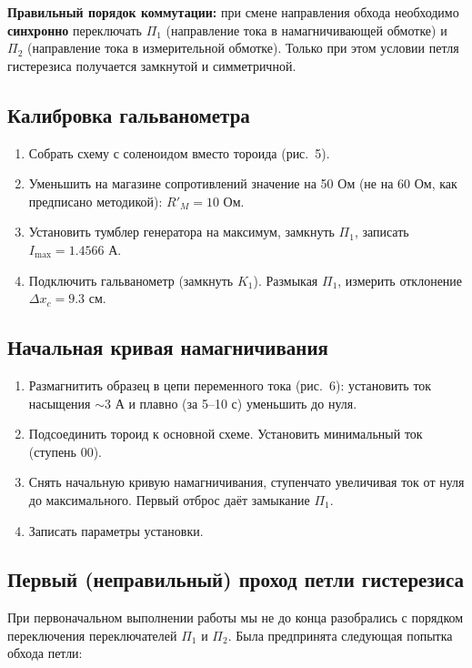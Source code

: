 \documentclass[a4paper]{article}
\begin{document}
\textbf{Правильный порядок коммутации:} при смене направления обхода необходимо \textbf{синхронно} переключать $\Pi_1$ (направление тока в намагничивающей обмотке) и $\Pi_2$ (направление тока в измерительной обмотке). Только при этом условии петля гистерезиса получается замкнутой и симметричной.

\subsection{Калибровка гальванометра}

\begin{enumerate}
	\item Собрать схему с соленоидом вместо тороида (рис.~5).
	\item Уменьшить на магазине сопротивлений значение на 50 Ом (не на 60 Ом, как предписано методикой): $R'_M = 10$ Ом.
	\item Установить тумблер генератора на максимум, замкнуть $\Pi_1$, записать $I_{\max} = 1.4566$ А.
	\item Подключить гальванометр (замкнуть $K_1$). Размыкая $\Pi_1$, измерить отклонение $\Delta x_c = 9.3$ см.
\end{enumerate}

\subsection{Начальная кривая намагничивания}

\begin{enumerate}
	\item Размагнитить образец в цепи переменного тока (рис.~6): установить ток насыщения $\sim 3$ А и плавно (за 5–10 с) уменьшить до нуля.
	\item Подсоединить тороид к основной схеме. Установить минимальный ток (ступень 00).
	\item Снять начальную кривую намагничивания, ступенчато увеличивая ток от нуля до максимального. Первый отброс даёт замыкание $\Pi_1$.
	\item Записать параметры установки.
\end{enumerate}

\subsection{Первый (неправильный) проход петли гистерезиса}

При первоначальном выполнении работы мы не до конца разобрались с порядком переключения переключателей $\Pi_1$ и $\Pi_2$. Была предпринята следующая попытка обхода петли:
\end{document}
